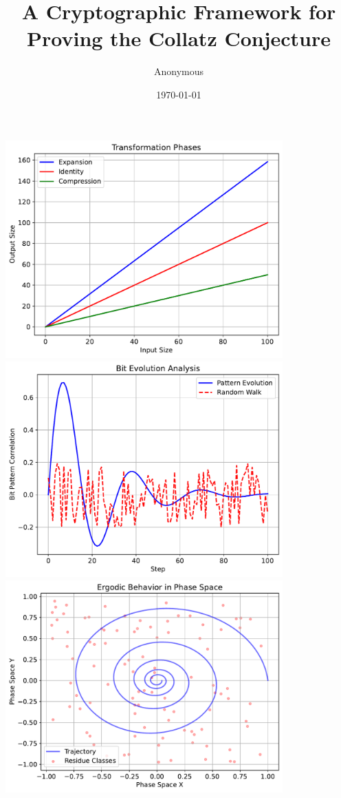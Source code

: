 \documentclass[12pt]{article}
\title{A Cryptographic Framework for Proving the Collatz Conjecture}
\author{Anonymous}
\date{\today}
\begin{document}
\maketitle



\tableofcontents










\includegraphics[width=0.8\textwidth]{transformation_phases.pdf}
\includegraphics[width=0.8\textwidth]{bit_evolution.pdf}
\includegraphics[width=0.8\textwidth]{ergodic_property.pdf}
\end{document}
